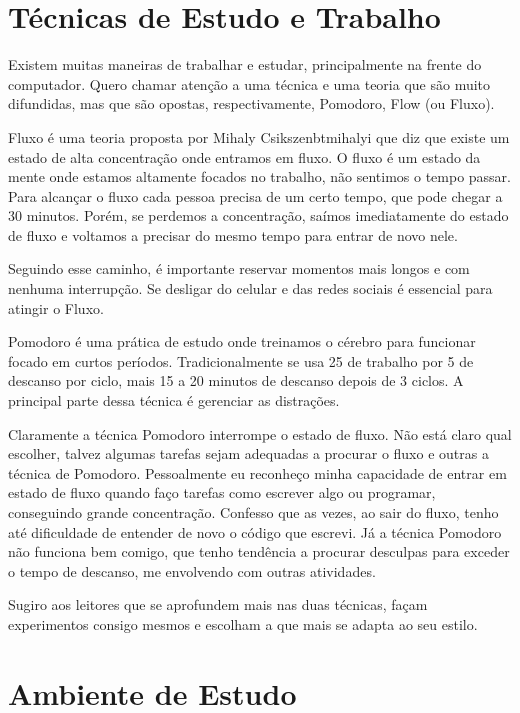 \section{Técnicas de Estudo e Trabalho}


Existem muitas maneiras de trabalhar e estudar, principalmente na frente do computador. Quero chamar atenção a uma técnica e uma teoria que são muito difundidas, mas que são opostas, respectivamente, Pomodoro, Flow (ou Fluxo).


Fluxo é uma teoria proposta por Mihaly Csikszenbtmihalyi que diz que existe um estado de alta concentração onde entramos em fluxo. O fluxo é um estado da mente onde estamos altamente focados no trabalho, não sentimos o tempo passar. Para alcançar o fluxo cada pessoa precisa de um certo tempo, que pode chegar a 30 minutos. Porém, se perdemos a concentração, saímos imediatamente do estado de fluxo e voltamos a precisar do mesmo tempo para entrar de novo nele. 


Seguindo esse caminho, é importante reservar momentos mais longos e com nenhuma interrupção. Se desligar do celular e das redes sociais é essencial para atingir o Fluxo.


Pomodoro é uma prática de estudo onde treinamos o cérebro para funcionar focado em curtos períodos. Tradicionalmente se usa 25 de trabalho por 5 de descanso por ciclo, mais 15 a 20 minutos de descanso depois de 3 ciclos. A principal parte dessa técnica é gerenciar as distrações.


Claramente a técnica Pomodoro interrompe o estado de fluxo. Não está claro qual escolher, talvez algumas tarefas sejam adequadas a procurar o fluxo e outras a técnica de Pomodoro. Pessoalmente eu reconheço minha capacidade de entrar em estado de fluxo quando faço tarefas como escrever algo ou programar, conseguindo grande concentração. Confesso que as vezes, ao sair do fluxo, tenho até dificuldade de entender de novo o código que escrevi. Já a técnica Pomodoro não funciona bem comigo, que tenho tendência a procurar desculpas para exceder o tempo de descanso, me envolvendo com outras atividades.


Sugiro aos leitores que se aprofundem mais nas duas técnicas, façam experimentos consigo mesmos e escolham a que mais se adapta ao seu estilo.


\section{Ambiente de Estudo}


